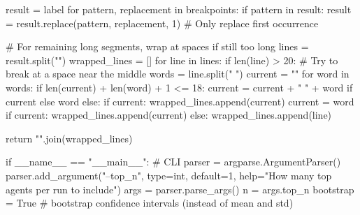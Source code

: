     result = label
    for pattern, replacement in breakpoints:
        if pattern in result:
            result = result.replace(pattern, replacement, 1)  # Only replace first occurrence

    # For remaining long segments, wrap at spaces if still too long
    lines = result.split("\n")
    wrapped_lines = []
    for line in lines:
        if len(line) > 20:
            # Try to break at a space near the middle
            words = line.split(" ")
            current = ""
            for word in words:
                if len(current) + len(word) + 1 <= 18:
                    current = current + " " + word if current else word
                else:
                    if current:
                        wrapped_lines.append(current)
                    current = word
            if current:
                wrapped_lines.append(current)
        else:
            wrapped_lines.append(line)

    return "\n".join(wrapped_lines)


if __name__ == "__main__":
    # CLI
    parser = argparse.ArgumentParser()
    parser.add_argument("--top_n", type=int, default=1, help="How many top agents per run to include")
    args = parser.parse_args()
    n = args.top_n
    bootstrap = True  # bootstrap confidence intervals (instead of mean and std)

